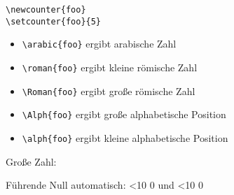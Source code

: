 \documentclass[a5paper]{article}
\begin{document}
\begin{verbatim}    
\newcounter{foo}
\setcounter{foo}{5}    
\end{verbatim}

\setcounter{foo}{5}     %

\begin{itemize}
\item \verb|\arabic{foo}| ergibt arabische Zahl 
\item \verb|\roman{foo}| ergibt kleine römische Zahl  
\item \verb|\Roman{foo}| ergibt große römische Zahl 
\item \verb|\Alph{foo}| ergibt große alphabetische Position 
\item \verb|\alph{foo}| ergibt kleine alphabetische Position 
\end{itemize}

\setcounter{foo}{7991}  %
Große Zahl:              %

\setcounter{foo}{4}

\def\leadingZero#1{\ifnum\value{foo}<10 0\fi\arabic{foo}}

Führende Null automatisch:
\setcounter{foo}{14}\leadingZero{foo} und 
\setcounter{foo}{4}\leadingZero{foo}
\end{document}
